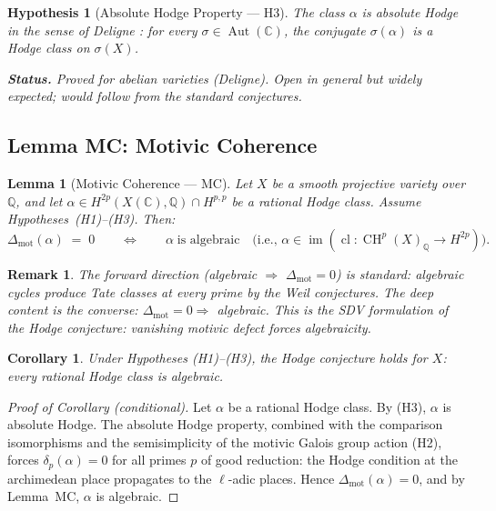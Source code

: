 \documentclass[11pt]{article}
\newtheorem{lemma}[theorem]{Lemma}
\newtheorem{corollary}[theorem]{Corollary}
\newtheorem{remark}[theorem]{Remark}
\newtheorem{hypothesis}[theorem]{Hypothesis}
\theoremstyle{definition}
\DeclareMathOperator{\cl}{cl}
\DeclareMathOperator{\CH}{CH}
\DeclareMathOperator{\Aut}{Aut}
\DeclareMathOperator{\im}{im}
\begin{document}
\begin{hypothesis}[Absolute Hodge Property --- H3]
\label{hyp:abs-hodge}
The class $\alpha$ is \emph{absolute Hodge} in the sense of
Deligne \cite{Deligne}: for every $\sigma \in \Aut(\mathbb{C})$,
the conjugate $\sigma(\alpha)$ is a Hodge class on $\sigma(X)$.

\smallskip
\noindent\textbf{Status.} Proved for abelian varieties (Deligne).
Open in general but widely expected; would follow from the standard
conjectures.
\end{hypothesis}

\subsection{Lemma MC: Motivic Coherence}

\begin{lemma}[Motivic Coherence --- MC]
\label{lem:MC}
Let $X$ be a smooth projective variety over $\mathbb{Q}$, and let
$\alpha \in H^{2p}(X(\mathbb{C}), \mathbb{Q}) \cap H^{p,p}$ be a rational
Hodge class.  Assume Hypotheses~\emph{(H1)--(H3)}.  Then:
\[
  \Delta_{\mathrm{mot}}(\alpha) \;=\; 0
  \qquad\Longleftrightarrow\qquad
  \alpha \;\text{is algebraic}
  \quad\bigl(\text{i.e., } \alpha \in \im(\cl : \CH^p(X)_{\mathbb{Q}} \to H^{2p})\bigr).
\]
\end{lemma}

\begin{remark}
The forward direction (algebraic $\Rightarrow$ $\Delta_{\mathrm{mot}} = 0$)
is standard: algebraic cycles produce Tate classes at every prime by
the Weil conjectures.  The deep content is the converse:
$\Delta_{\mathrm{mot}} = 0 \Rightarrow$ algebraic.  This is the SDV
formulation of the Hodge conjecture: vanishing motivic defect forces
algebraicity.
\end{remark}

\begin{corollary}
\label{cor:hodge}
Under Hypotheses (H1)--(H3), the Hodge conjecture holds for $X$: every
rational Hodge class is algebraic.
\end{corollary}

\begin{proof}[Proof of Corollary (conditional)]
Let $\alpha$ be a rational Hodge class.  By (H3), $\alpha$ is absolute
Hodge.  The absolute Hodge property, combined with the comparison
isomorphisms and the semisimplicity of the motivic Galois group action
(H2), forces $\delta_p(\alpha) = 0$ for all primes $p$ of good reduction:
the Hodge condition at the archimedean place propagates to the $\ell$-adic
places.  Hence $\Delta_{\mathrm{mot}}(\alpha) = 0$, and by Lemma~MC,
$\alpha$ is algebraic.
\end{proof}
\end{document}
